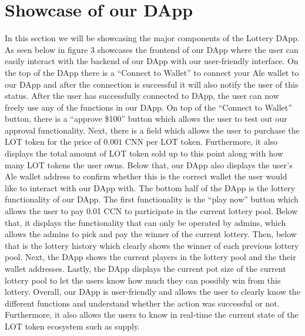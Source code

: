 \documentclass[11pt]{article}
\begin{document}
\section*{Showcase of our DApp}
In this section we will be showcasing the major components of the Lottery DApp. As seen below in figure 3 showcases the frontend of our DApp where the user can easily interact with the backend of our DApp with our user-friendly interface. On the top of the DApp there is a “Connect to Wallet” to connect your Ale wallet to our DApp and after the connection is successful it will also notify the user of this status. After the user has successfully connected to DApp, the user can now freely use any of the functions in our DApp. On top of the “Connect to Wallet” button, there is a “approve \$100” button which allows the user to test out our approval functionality. Next, there is a field which allows the user to purchase the LOT token for the price of $0.001$ CNN per LOT token. Furthermore, it also displays the total amount of LOT token sold up to this point along with how many LOT tokens the user owns. Below that, our DApp also displays the user’s Ale wallet address to confirm whether this is the correct wallet the user would like to interact with our DApp with. The bottom half of the DApp is the lottery functionality of our DApp. The first functionality is the “play now” button which allows the user to pay 0.01 CCN to participate in the current lottery pool. Below that, it displays the functionality that can only be operated by admins, which allows the admins to pick and pay the winner of the current lottery. Then, below that is the lottery history which clearly shows the winner of each previous lottery pool. Next, the DApp shows the current players in the lottery pool and the their wallet addresses. Lastly, the DApp displays the current pot size of the current lottery pool to let the users know how much they can possibly win from this lottery. Overall, our DApp is user-friendly and allows the user to clearly know the different functions and understand whether the action was successful or not. Furthermore, it also allows the users to know in real-time the current state of the LOT token ecosystem such as supply.
\end{document}
